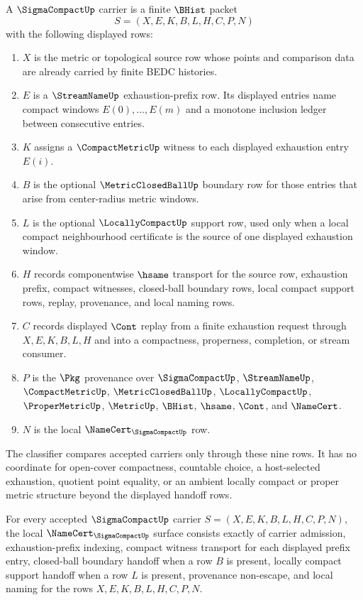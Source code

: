 \begin{definition}\label{def:sigma-compact-carrier}
A $\SigmaCompactUp$ carrier is a finite $\BHist$ packet
$$
S=(X,E,K,B,L,H,C,P,N)
$$
with the following displayed rows:
\begin{enumerate}
\item $X$ is the metric or topological source row whose points and comparison data are already carried by finite BEDC histories.
\item $E$ is a $\StreamNameUp$ exhaustion-prefix row. Its displayed entries name compact windows $E(0),\ldots,E(m)$ and a monotone inclusion ledger between consecutive entries.
\item $K$ assigns a $\CompactMetricUp$ witness to each displayed exhaustion entry $E(i)$.
\item $B$ is the optional $\MetricClosedBallUp$ boundary row for those entries that arise from center-radius metric windows.
\item $L$ is the optional $\LocallyCompactUp$ support row, used only when a local compact neighbourhood certificate is the source of one displayed exhaustion window.
\item $H$ records componentwise $\hsame$ transport for the source row, exhaustion prefix, compact witnesses, closed-ball boundary rows, local compact support rows, replay, provenance, and local naming rows.
\item $C$ records displayed $\Cont$ replay from a finite exhaustion request through $X,E,K,B,L,H$ and into a compactness, properness, completion, or stream consumer.
\item $P$ is the $\Pkg$ provenance over $\SigmaCompactUp$, $\StreamNameUp$, $\CompactMetricUp$, $\MetricClosedBallUp$, $\LocallyCompactUp$, $\ProperMetricUp$, $\MetricUp$, $\BHist$, $\hsame$, $\Cont$, and $\NameCert$.
\item $N$ is the local $\NameCert_{\SigmaCompactUp}$ row.
\end{enumerate}
The classifier compares accepted carriers only through these nine rows. It has no coordinate for open-cover compactness, countable choice, a host-selected exhaustion, quotient point equality, or an ambient locally compact or proper metric structure beyond the displayed handoff rows.
\end{definition}
\begin{theorem}\label{thm:sigma-compact-namecert-obligations}
For every accepted $\SigmaCompactUp$ carrier $S=(X,E,K,B,L,H,C,P,N)$, the local $\NameCert_{\SigmaCompactUp}$ surface consists exactly of carrier admission, exhaustion-prefix indexing, compact witness transport for each displayed prefix entry, closed-ball boundary handoff when a row $B$ is present, locally compact support handoff when a row $L$ is present, provenance non-escape, and local naming for the rows $X,E,K,B,L,H,C,P,N$.
\end{theorem}

